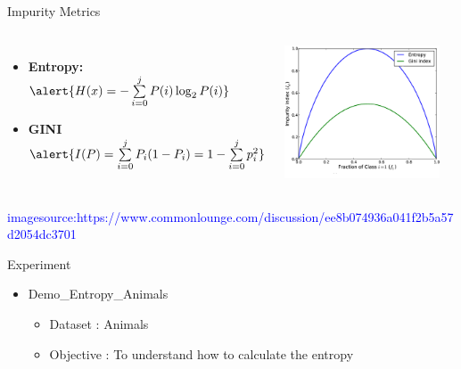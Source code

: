 \documentclass[aspectratio=169, 14pt]{beamer}
\begin{document}
\begin{frame}[t]{Impurity Metrics}
	\begin{columns}
		\begin{itemize}
			\item \textbf{Entropy:}
				$ \alert{H(x)= -\sum\limits_{i = 0}^{j} P(i)\log_{2}{P(i)}}   $
			\item \textbf{GINI} 
				$\alert{ I(P) = \sum\limits_{i = 0}^{j} P_i(1-P_i)=1-\sum\limits_{i = 0}^{j}p_i^2} $
		\end{itemize}
		        \includegraphics[width=0.9\textwidth, height=0.6\textheight]{DT_OF_Images/dtree2_9.png}
	\end{columns}
\centering	 \tiny{\textcolor{blue}{imagesource:https://www.commonlounge.com/discussion/ee8b074936a041f2b5a57d2054dc3701}}


\end{frame}


\begin{frame}[c]{Experiment}
	\begin{itemize}
		\item {Demo\_Entropy\_Animals}
			\begin{itemize}
				\item Dataset : Animals
				\item Objective : To understand how to calculate the entropy
			\end{itemize}

	\end{itemize}
\end{frame}
\end{document}

